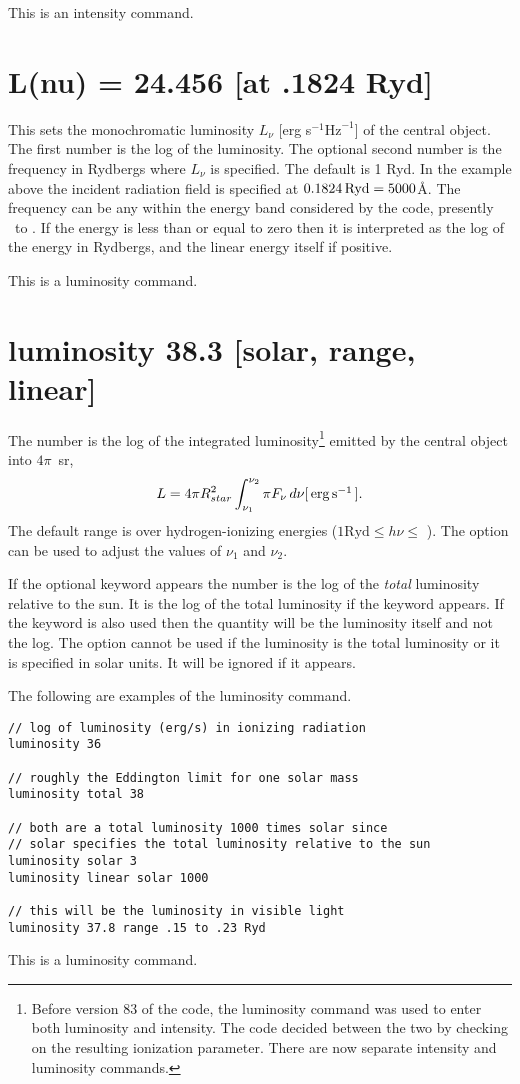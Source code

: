 This is an intensity command.

\section{L(nu) = 24.456 [at .1824 Ryd]}

This sets the monochromatic luminosity
$L_{\nu}$ [erg s$^{-1} \mathrm{Hz}^{-1}$] of the central object.
The first number is the log of the luminosity.
The optional
second number is the frequency in Rydbergs where $L_{\nu}$ is specified.  The default is 1 Ryd.
In the example above the incident radiation field is specified at
$0.1824 {\rm\thinspace Ryd} = 5000 $\AA.
The frequency can be any within the energy band considered
by the code, presently \emm\ to \egamry .  If the energy is
less than or equal to zero then it is interpreted as the log of the energy
in Rydbergs, and the linear energy itself if positive.

This is a luminosity command.

\section{luminosity 38.3 [solar, range, linear]}

The number is the log of the integrated luminosity\footnote{Before version 83 of the code, the luminosity command was used to
enter both luminosity and intensity.  The code decided between the two by
checking on the resulting ionization parameter.  There are now separate
intensity and luminosity commands.} emitted by the central
object into $4\pi$~sr,
\begin{equation}
L = 4 \pi R_{star}^2 \int_{\nu _1 }^{\nu _2 } {\pi F_\nu
\, d\nu } [\ergps ].%
\end{equation}
The default range is over hydrogen-ionizing energies ($1\mathrm{ Ryd} \le
h\nu\le$ \egamry ).  The  option can be used to adjust
the values of $\nu_1$ and $\nu_2$.

If the optional keyword  appears
the number is the log of the \emph{total} luminosity relative to the sun. 
It is the log of the total luminosity if the keyword  appears.
If the
 keyword is also used then the quantity will be the luminosity itself
and not the log.
The  option cannot be used if the luminosity is the
total luminosity or it is specified in solar units.
It will be ignored
if it appears.

The following are examples of the luminosity command.
\begin{verbatim}
// log of luminosity (erg/s) in ionizing radiation
luminosity 36

// roughly the Eddington limit for one solar mass
luminosity total 38

// both are a total luminosity 1000 times solar since
// solar specifies the total luminosity relative to the sun
luminosity solar 3
luminosity linear solar 1000

// this will be the luminosity in visible light
luminosity 37.8 range .15 to .23 Ryd
\end{verbatim}
This is a luminosity command.

